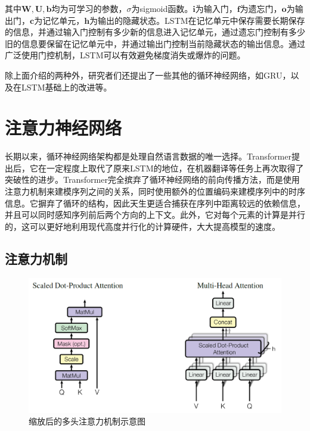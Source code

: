 其中$\bm{W},\bm{U},\bm{b}$均为可学习的参数，$\sigma$为sigmoid函数。$\bm{i}$为输入门，$\bm{f}$为遗忘门，$\bm{o}$为输出门，$\bm{c}$为记忆单元，$\bm{h}$为输出的隐藏状态。LSTM在记忆单元中保存需要长期保存的信息，并通过输入门控制有多少新的信息进入记忆单元，通过遗忘门控制有多少旧的信息要保留在记忆单元中，并通过输出门控制当前隐藏状态的输出信息。通过广泛使用门控机制，LSTM可以有效避免梯度消失或爆炸的问题。

除上面介绍的两种外，研究者们还提出了一些其他的循环神经网络，如GRU\cite{cho-etal-2014-properties}，以及在LSTM基础上的改进等。

\section{注意力神经网络}

长期以来，循环神经网络架构都是处理自然语言数据的唯一选择。Transformer\cite{attn17}提出后，它在一定程度上取代了原来LSTM的地位，在机器翻译等任务上再次取得了突破性的进步。Transformer完全摈弃了循环神经网络的前向传播方法，而是使用注意力机制来建模序列之间的关系，同时使用额外的位置编码来建模序列中的时序信息。它摒弃了循环的结构，因此天生更适合捕获在序列中距离较远的依赖信息，并且可以同时感知序列前后两个方向的上下文。此外，它对每个元素的计算是并行的，这可以更好地利用现代高度并行化的计算硬件，大大提高模型的速度。

\subsection{注意力机制}

\begin{figure}
    \centering
    \includegraphics[width=\linewidth]{figure/scaled_multiheaded_attn.png}
    \caption{缩放后的多头注意力机制示意图\cite{attn17}}
    \label{attn}
\end{figure}


